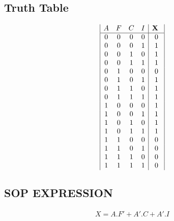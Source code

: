 \documentclass{article}
\begin{document}
\subsection{Truth Table}
\begin{displaymath}
\begin{array}{|c c c c |c|}
A & F & C &I &\textbf{X } \\ %
\hline %
0 & 0 & 0 & 0 & 0 \\
0 & 0 & 0 & 1 & 1 \\
0 & 0 & 1 & 0 & 1 \\
0 & 0 & 1 & 1 & 1 \\
0 & 1 & 0 & 0 & 0 \\
0 & 1 & 0 & 1 & 1 \\
0 & 1 & 1 & 0 & 1 \\
0 & 1 & 1 & 1 & 1 \\
1 & 0 & 0 & 0 & 1 \\
1 & 0 & 0 & 1 & 1 \\
1 & 0 & 1 & 0 & 1 \\
1 & 0 & 1 & 1 & 1 \\
1 & 1 & 0 & 0 & 0 \\
1 & 1 & 0 & 1 & 0 \\
1 & 1 & 1 & 0 & 0 \\
1 & 1 & 1 & 1 & 0 \\



\end{array}
\end{displaymath}

\subsection{SOP EXPRESSION}
      \begin{align}
         X=A.F' +A'.C +A'.I 
      \end{align}     
      
   
\end{document}

